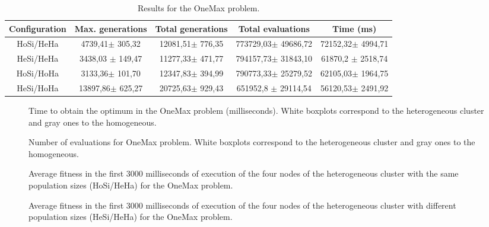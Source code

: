 \begin{table*}
\centering
\caption{Results for the OneMax problem.}
\begin{tabular}{|c|c|c|c|c|} \hline
Configuration & Max. generations      & Total generations     &   Total evaluations     & Time (ms) \\ \hline
HoSi/HeHa   & 4739,41$\pm$  305,32    & 12081,51$\pm$ 776,35  & 773729,03$\pm$  49686,72  & 72152,32$\pm$ 4994,71 \\ \hline
HeSi/HeHa   & 3438,03 $\pm$ 149,47 &  11277,33$\pm$ 471,77 &  794157,73$\pm$  31843,10  & 61870,2 $\pm$ 2518,74 \\ \hline \hline
HoSi/HoHa   & 3133,36$\pm$  101,70  & 12347,83$\pm$ 394,99  & 790773,33$\pm$  25279,52  & 62105,03$\pm$ 1964,75 \\ \hline
HeSi/HoHa   & 13897,86$\pm$ 625,27    & 20725,63$\pm$ 929,43  & 651952,8 $\pm$  29114,54  & 56120,53$\pm$ 2491,92 \\ \hline
\end{tabular}
\label{tab:onemaxresults}
\end{table*}



\begin{figure}
\centering
{}
\caption{Time to obtain the optimum in the OneMax problem (milliseconds). White boxplots correspond to the heterogeneous cluster and gray ones to the homogeneous.}
\label{fig:timeOneMax}
\end{figure}

\begin{figure}
\centering
{}
\caption{Number of evaluations for OneMax problem. White boxplots correspond to the heterogeneous cluster and gray ones to the homogeneous.}
\label{fig:evalsOneMax}
\end{figure}

\begin{figure*}
\centering
{}
\caption{Average fitness in the first 3000 milliseconds of execution of the four nodes of the heterogeneous cluster with the same population sizes (HoSi/HeHa) for the OneMax problem.}
\label{fig:gensonemaxhomosize}
\end{figure*}

\begin{figure*}
\centering
{}
\caption{Average fitness in the first 3000 milliseconds of execution of the four nodes of the heterogeneous cluster with different population sizes (HeSi/HeHa) for the OneMax problem.}
\label{fig:gensonemaxheterosize}
\end{figure*}

